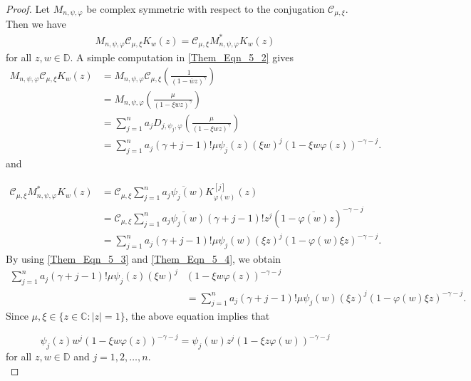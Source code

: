 \documentclass[12pt, reqno]{amsart}
\theoremstyle{definition}
\theoremstyle{remark}
\numberwithin{equation}{section}
\begin{document}
\begin{proof}
Let $M_{n, \psi, \varphi}$ be complex symmetric with respect to the conjugation $\mathcal{C}_{\mu, \xi}$. 
Then we have
\begin{align}\label{Them_Eqn_5_2}
M_{n,\psi, \varphi}\mathcal{C}_{\mu, \xi}K_w(z)= \mathcal{C}_{\mu, \xi}M_{n,\psi, \varphi}^*K_w(z)
\end{align}
for all $z,w\in \mathbb{D}$.
A simple computation in \eqref{Them_Eqn_5_2} gives
 \begin{align}\label{Them_Eqn_5_3}
M_{n,\psi, \varphi}\mathcal{C}_{\mu, \xi}K_w(z)&=M_{n,\psi, \varphi}\mathcal{C}_{\mu, \xi}\left(\frac{1}{(1-\overline{w}z)^{\gamma}}\right)\nonumber\\
&=M_{n,\psi, \varphi}\left(\frac{\mu}{(1-\xi wz)^{\gamma}}\right)\nonumber\\
&=\displaystyle\sum_{j=1}^{n}a_jD_{j,\psi_j, \varphi} \left(\frac{\mu}{(1-\xi wz)^{\gamma}}\right)\nonumber\\
&=\displaystyle\sum_{j=1}^{n}a_j(\gamma+j-1)!\mu \psi_j(z)(\xi w)^{j}(1-\xi w\varphi(z))^{-\gamma-j}.
\end{align}
and 

\begin{align}\label{Them_Eqn_5_4}
\mathcal{C}_{\mu, \xi} M_{n,\psi, \varphi}^*K_w(z)&=\mathcal{C}_{\mu, \xi}\displaystyle\sum_{j=1}^{n}\overline{a_j\psi_j(w)}K_{\varphi(w)}^{[j]}(z)\nonumber\\
&=\mathcal{C}_{\mu, \xi}\displaystyle\sum_{j=1}^{n}\overline{a_j\psi_j(w)}(\gamma+j-1)!z^{j}(1-\overline{\varphi(w)}z)^{-\gamma-j}\nonumber\\
&=\displaystyle\sum_{j=1}^{n}a_j(\gamma+j-1)!\mu\psi_j(w)(\xi z)^{j}(1-\varphi(w)\xi z)^{-\gamma-j}.
\end{align}
By using \eqref{Them_Eqn_5_3} and \eqref{Them_Eqn_5_4}, we obtain
\begin{align*}
\displaystyle\sum_{j=1}^{n}a_j(\gamma+j-1)!\mu \psi_j(z)(\xi w)^{j}&(1-\xi w\varphi(z))^{-\gamma-j}\\
&=\displaystyle\sum_{j=1}^{n}a_j(\gamma+j-1)!\mu\psi_j(w)(\xi z)^{j}(1-\varphi(w)\xi z)^{-\gamma-j}.
\end{align*}
Since $\mu, \xi\in \{z\in \mathbb{C}: |z|=1\}$, the above equation implies that 

\begin{equation}\label{Them_Eqn_5_5}
 \psi_j(z)w^{j}(1-\xi w\varphi(z))^{-\gamma-j}=\psi_j(w)z^{j}(1-\xi z\varphi(w))^{-\gamma-j}
\end{equation}
for all $z,w\in \mathbb{D}$ and $j=1,2, \dots, n$.\\


\end{proof}
\end{document}
